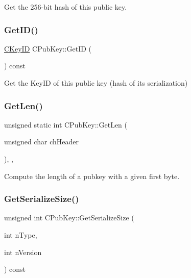 Get the 256-\/bit hash of this public key. 

\mbox{\label{class_c_pub_key_a2675f7e6f72eff68e7a5227289feb021}} 
\subsubsection{\texorpdfstring{Get\+I\+D()}{GetID()}}
{\footnotesize\ttfamily \mbox{\hyperlink{class_c_key_i_d}{C\+Key\+ID}} C\+Pub\+Key\+::\+Get\+ID (\begin{DoxyParamCaption}{ }\end{DoxyParamCaption}) const\hspace{0.3cm}{\ttfamily [inline]}}



Get the Key\+ID of this public key (hash of its serialization) 

\mbox{\label{class_c_pub_key_a7dc71b3f037c84268dc22de97d7b65fb}} 
\subsubsection{\texorpdfstring{Get\+Len()}{GetLen()}}
{\footnotesize\ttfamily unsigned static int C\+Pub\+Key\+::\+Get\+Len (\begin{DoxyParamCaption}\item[{unsigned char}]{ch\+Header }\end{DoxyParamCaption})\hspace{0.3cm}{\ttfamily [inline]}, {\ttfamily [static]}, {\ttfamily [private]}}



Compute the length of a pubkey with a given first byte. 

\mbox{\label{class_c_pub_key_aeb5fed8b8e3dea754e485147c1a1a8ed}} 
\subsubsection{\texorpdfstring{Get\+Serialize\+Size()}{GetSerializeSize()}}
{\footnotesize\ttfamily unsigned int C\+Pub\+Key\+::\+Get\+Serialize\+Size (\begin{DoxyParamCaption}\item[{int}]{n\+Type,  }\item[{int}]{n\+Version }\end{DoxyParamCaption}) const\hspace{0.3cm}{\ttfamily [inline]}}



